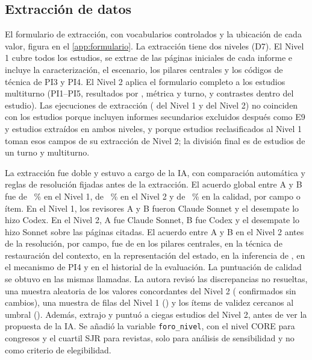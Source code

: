 \subsection{Extracción de datos}
\label{sec:met-extraccion}

El formulario de extracción, con vocabularios controlados y la ubicación de cada valor, figura en el \cref{app:formulario}. La extracción tiene dos niveles (D7). El Nivel 1 cubre todos los estudios, se extrae de las páginas iniciales de cada informe e incluye la caracterización, el escenario, los pilares centrales y los códigos de técnica de PI3 y PI4. El Nivel 2 aplica el formulario completo a los estudios multiturno (PI1–PI5, resultados por , métrica y turno, y contrastes dentro del estudio). Las ejecuciones de extracción (\nExtrNivelUno{} del Nivel 1 y \nExtrNivelDos{} del Nivel 2) no coinciden con los \nEstudios{} estudios porque incluyen \nSecundariosExtraidos{} informes secundarios excluidos después como E9 y \nAmbosNiveles{} estudios extraídos en ambos niveles, y porque \nNivelDosAUno{} estudios reclasificados al Nivel 1 toman esos campos de su extracción de Nivel 2; la división final es de \nUnTurno{} estudios de un turno y \nMultiturno{} multiturno.

La extracción fue doble y estuvo a cargo de la IA, con comparación automática y reglas de resolución fijadas antes de la extracción. El acuerdo global entre A y B fue de \acuerdoNivelUno~\% en el Nivel 1, de \acuerdoNivelDos~\% en el Nivel 2 y de \acuerdoCalidad~\% en la calidad, por campo o ítem. En el Nivel 1, los revisores A y B fueron Claude Sonnet y el desempate lo hizo Codex. En el Nivel 2, A fue Claude Sonnet, B fue Codex y el desempate lo hizo Sonnet sobre las páginas citadas. El acuerdo entre A y B en el Nivel 2 antes de la resolución, por campo, fue de \acuerdoCampoPilaresCentrales{} en los pilares centrales, \acuerdoCampoTecnicaContexto{} en la técnica de restauración del contexto, \acuerdoCampoRepresentacion{} en la representación del estado, \acuerdoCampoInferenciaJoins{} en la inferencia de , \acuerdoCampoMecanismo{} en el mecanismo de PI4 y \acuerdoCampoHistorial{} en el historial de la evaluación. La puntuación de calidad se obtuvo en las mismas llamadas. La autora revisó las discrepancias no resueltas, una muestra aleatoria de los valores concordantes del Nivel 2 (\verifC{} confirmados sin cambios), una muestra de filas del Nivel 1 (\verifD{}) y los ítems de validez cercanos al umbral (\verifB{}). Además, extrajo y puntuó a ciegas \nMuestraCiega{} estudios del Nivel 2, antes de ver la propuesta de la IA. Se añadió la variable \texttt{foro\_nivel}, con el nivel CORE para congresos y el cuartil SJR para revistas, solo para análisis de sensibilidad y no como criterio de elegibilidad.

